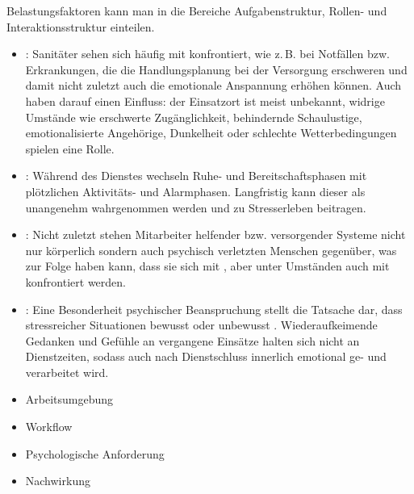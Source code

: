  

Belastungsfaktoren kann man in die
Bereiche Aufgabenstruktur, Rollen- und Interaktionsstruktur
einteilen.


{\begin{itemize}
  \item {}: Sanitäter sehen sich häufig
  mit  konfrontiert, wie
  z.\,B. bei Notfällen bzw. Erkrankungen, die die
  Handlungsplanung bei der Versorgung erschweren und damit
  nicht zuletzt auch die emotionale Anspannung erhöhen können.
  Auch  haben darauf einen
  Einfluss: der Einsatzort ist meist unbekannt, widrige
  Umstände wie erschwerte Zugänglichkeit, behindernde
  Schaulustige, emotionalisierte Angehörige, Dunkelheit oder
  schlechte Wetterbedingungen spielen eine Rolle.
  
  \item {}: Während des Dienstes wechseln
   Ruhe- und Bereitschaftsphasen mit plötzlichen Aktivitäts-
   und Alarmphasen. Langfristig kann dieser  als unangenehm wahrgenommen
  werden und zu Stresserleben beitragen.
  
  \item {}: Nicht zuletzt
  stehen Mitarbeiter helfender bzw. versorgender Systeme nicht
  nur körperlich sondern auch psychisch verletzten Menschen
  gegenüber, was zur Folge haben kann, dass sie sich mit
  , aber unter Umständen auch mit
   konfrontiert werden.
  
  \item {}: Eine Besonderheit psychischer
  Beanspruchung stellt die Tatsache dar, dass  stressreicher Situationen
  bewusst oder unbewusst . Wiederaufkeimende
  Gedanken und Gefühle an vergangene Einsätze halten sich
  nicht an Dienstzeiten, sodass auch nach Dienstschluss
  innerlich emotional ge- und verarbeitet wird.
\end{itemize}}
{\begin{itemize}
  \item {Arbeitsumgebung}
  \item {Workflow}
  \item {Psychologische Anforderung} 
  \item {Nachwirkung}
\end{itemize}}
{}
{}
{}

